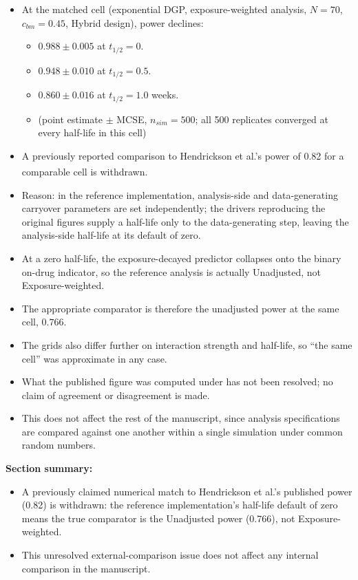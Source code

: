 \documentclass[
  11pt,
]{article}
\providecommand{\tightlist}{%
  \setlength{\itemsep}{0pt}\setlength{\parskip}{0pt}}
\begin{document}
\begin{itemize}
\tightlist
\item
  At the matched cell (exponential DGP, exposure-weighted analysis,
  \(N=70\), \(c_{bm}=0.45\), Hybrid design), power declines:

  \begin{itemize}
  \tightlist
  \item
    \(0.988 \pm 0.005\) at \(t_{1/2}=0\).
  \item
    \(0.948 \pm 0.010\) at \(t_{1/2}=0.5\).
  \item
    \(0.860 \pm 0.016\) at \(t_{1/2}=1.0\) weeks.
  \item
    (point estimate \(\pm\) MCSE, \(n_{sim}=500\); all 500 replicates
    converged at every half-life in this cell)
  \end{itemize}
\item
  A previously reported comparison to Hendrickson et al.'s power of
  0.82 for a comparable cell\textsuperscript{} is withdrawn.
\item
  Reason: in the reference implementation, analysis-side and
  data-generating carryover parameters are set independently; the
  drivers reproducing the original figures supply a half-life only to
  the data-generating step, leaving the analysis-side half-life at
  its default of zero.
\item
  At a zero half-life, the exposure-decayed predictor collapses onto
  the binary on-drug indicator, so the reference analysis is actually
  Unadjusted, not Exposure-weighted.
\item
  The appropriate comparator is therefore the unadjusted power at the
  same cell, \(0.766\).
\item
  The grids also differ further on interaction strength and
  half-life, so ``the same cell'' was approximate in any case.
\item
  What the published figure was computed under has not been
  resolved; no claim of agreement or disagreement is made.
\item
  This does not affect the rest of the manuscript, since analysis
  specifications are compared against one another within a single
  simulation under common random numbers.
\end{itemize}

\textbf{Section summary:}

\begin{itemize}
\tightlist
\item
  A previously claimed numerical match to Hendrickson et al.'s
  published power (0.82) is withdrawn: the reference implementation's
  half-life default of zero means the true comparator is the
  Unadjusted power (0.766), not Exposure-weighted.
\item
  This unresolved external-comparison issue does not affect any
  internal comparison in the manuscript.
\end{itemize}
\end{document}
